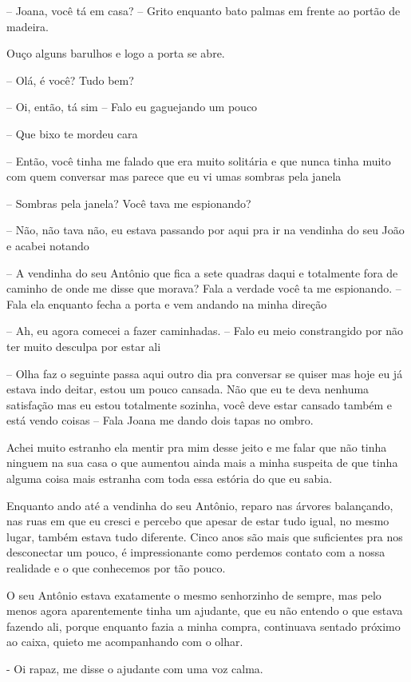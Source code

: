 -- Joana, você tá em casa? -- Grito enquanto bato palmas em frente ao portão de madeira.

Ouço alguns barulhos e logo a porta se abre.

-- Olá, é você? Tudo bem?

-- Oi, então, tá sim -- Falo eu gaguejando um pouco

-- Que bixo te mordeu cara

-- Então, você tinha me falado que era muito solitária e que nunca tinha muito com quem conversar mas parece que eu vi umas sombras pela janela

-- Sombras pela janela? Você tava me espionando? 

-- Não, não tava não, eu estava passando por aqui pra ir na vendinha do seu João e acabei notando

-- A vendinha do seu Antônio que fica a sete quadras daqui e totalmente fora de caminho de onde me disse que morava? Fala a verdade você ta me espionando. -- Fala ela enquanto fecha a porta e vem andando na minha direção

-- Ah, eu agora comecei a fazer caminhadas. -- Falo eu meio constrangido por não ter muito desculpa por estar ali

-- Olha faz o seguinte passa aqui outro dia pra conversar se quiser mas hoje eu já estava indo deitar, estou um pouco cansada. Não que eu te deva nenhuma satisfação mas eu estou totalmente sozinha, você deve estar cansado também e está vendo coisas -- Fala Joana me dando dois tapas no ombro.

Achei muito estranho ela mentir pra mim desse jeito e me falar que não tinha ninguem na sua casa o que aumentou ainda mais a minha suspeita de que tinha alguma coisa mais estranha com toda essa estória do que eu sabia.

Enquanto ando até a vendinha do seu Antônio, reparo nas árvores balançando, nas ruas em que eu cresci e percebo que apesar de estar tudo igual, no mesmo lugar, também estava tudo diferente. Cinco anos são mais que suficientes pra nos desconectar um pouco, é impressionante como perdemos contato com a nossa realidade e o que conhecemos por tão pouco.

O seu Antônio estava exatamente o mesmo senhorzinho de sempre, mas pelo menos agora aparentemente tinha um ajudante, que eu não entendo o que estava fazendo ali, porque enquanto fazia a minha compra, continuava sentado próximo ao caixa, quieto me acompanhando com o olhar.

- Oi rapaz, me disse o ajudante com uma voz calma. 

